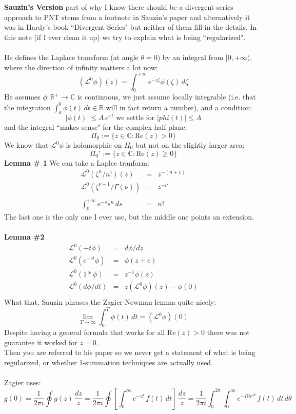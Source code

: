 \documentclass[12pt]{article}
\begin{document}
\newpage

\noindent \textbf{Sauzin's Version} part of why I know there should be a divergent series approach to PNT stems from a footnote in Sauzin's paper and alternatively it was in Hardy's book ``Divergent Series" but neither of them fill in the details.  In this note (if I ever clean it up) we try to explain what is being ``regularized". \\ \\
He defines the Laplace transform (at angle $\theta = 0$) by an integral from $[0, +\infty)$, where the direction of infinity matters a lot now:
$$ (\mathcal{L}^0 \phi)(z) = \int_0^{+\infty} e^{-z\zeta} \phi(\zeta) \, d\zeta $$
He assumes $\phi: \mathbb{R}^+ \to \mathbb{C}$ is continuous, we just assume locally integrable (i.e. that the integration $\int_a^b \phi(t) \, dt \in \mathbb{R}$ will in fact return a number), and a condition:
$$ |\phi(t)|\leq A \, e^{c \, t} \text{ we settle for } |phi(t)| \leq A$$
and the integral ``makes sense" for the complex half plane:
$$ \Pi_0 := \{ z \in \mathbb{C} : \mathrm{Re}(z) > 0\} $$
We know that $\mathcal{L}^0\phi$ is holomorphic on $\Pi_0$ but not on the slightly larger area:
$$ \Pi_0' := \{ z \in \mathbb{C} : \mathrm{Re}(z) \geq 0\} $$
\textbf{Lemma \# 1} We can take a Laplce tranform:
\begin{eqnarray*}
\mathcal{L}^0(\zeta^n/n!) (z) &=& z^{-(n+1)} \\
\mathcal{L}^0(\zeta^{\nu-1}/\Gamma(\nu))&=& z^{-\nu} \\ \\
\int_0^{+\infty} e^{-s} s^n \, ds&=& n!
\end{eqnarray*}
The last one is the only one I ever use, but the middle one points an extension.\\ \\
\textbf{Lemma \#2}
\begin{eqnarray*}
\mathcal{L}^0 (-t\phi) &=& d\phi/dz\\
\mathcal{L}^0 (e^{-ct}\phi) &=& \phi(z+c) \\
\mathcal{L}^0(1 \ast \phi) &=& z^{-1}\phi(z)\\
\mathcal{L}^0 (d\phi/dt) &=& z (\mathcal{L}^0 \phi)(z) - \phi(0)\\
\end{eqnarray*}
What that, Sauzin phrases the Zagier-Newman lemma quite nicely:
$$  \lim_{T \to \infty} \int_0^T \phi(t) \, dt = (\mathcal{L}^0 \phi)(0)$$
Despite having a general formula that works for all $\mathrm{Re}(z) > 0$ there was not guarantee it worked for $z = 0$. \\
Then you are referred to his paper so we never get a statement of what is being regularized, or whether 1-summation techniques are actually used. \\ \\
Zagier uses:
$$ g(0) = \frac{1}{2\pi i} \oint g(z) \, \frac{dz}{z} 
= 
\frac{1}{2\pi i} \oint 
\left[ \int_0^\infty e^{-zt} \, f(t) \, dt \right] \, \frac{dz}{z} 
= 
\frac{1}{2\pi i} \int_0^{2\pi}  \int_0^\infty e^{- R te^{i\theta}} \, f(t) \, dt  \, d\theta  $$
\end{document}
